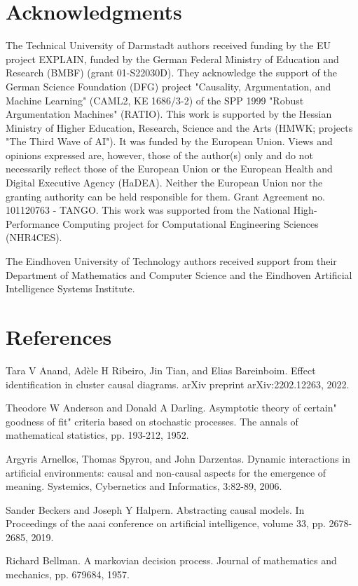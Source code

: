 \documentclass[10pt]{article}
\begin{document}
\section*{Acknowledgments}
The Technical University of Darmstadt authors received funding by the EU project EXPLAIN, funded by the German Federal Ministry of Education and Research (BMBF) (grant 01-S22030D). They acknowledge the support of the German Science Foundation (DFG) project "Causality, Argumentation, and Machine Learning" (CAML2, KE 1686/3-2) of the SPP 1999 "Robust Argumentation Machines" (RATIO). This work is supported by the Hessian Ministry of Higher Education, Research, Science and the Arts (HMWK; projects "The Third Wave of AI"). It was funded by the European Union. Views and opinions expressed are, however, those of the author(s) only and do not necessarily reflect those of the European Union or the European Health and Digital Executive Agency (HaDEA). Neither the European Union nor the granting authority can be held responsible for them. Grant Agreement no. 101120763 - TANGO. This work was supported from the National High-Performance Computing project for Computational Engineering Sciences (NHR4CES).

The Eindhoven University of Technology authors received support from their Department of Mathematics and Computer Science and the Eindhoven Artificial Intelligence Systems Institute.

\section*{References}
Tara V Anand, Adèle H Ribeiro, Jin Tian, and Elias Bareinboim. Effect identification in cluster causal diagrams. arXiv preprint arXiv:2202.12263, 2022.

Theodore W Anderson and Donald A Darling. Asymptotic theory of certain" goodness of fit" criteria based on stochastic processes. The annals of mathematical statistics, pp. 193-212, 1952.

Argyris Arnellos, Thomas Spyrou, and John Darzentas. Dynamic interactions in artificial environments: causal and non-causal aspects for the emergence of meaning. Systemics, Cybernetics and Informatics, 3:82-89, 2006.

Sander Beckers and Joseph Y Halpern. Abstracting causal models. In Proceedings of the aaai conference on artificial intelligence, volume 33, pp. 2678-2685, 2019.

Richard Bellman. A markovian decision process. Journal of mathematics and mechanics, pp. 679684, 1957.
\end{document}
